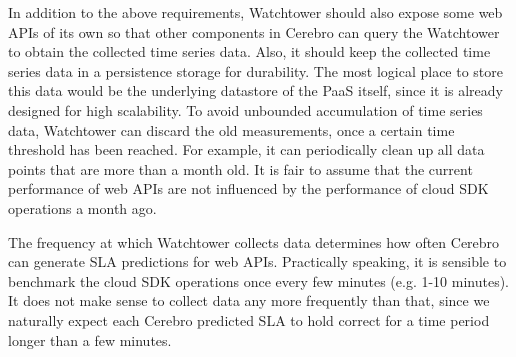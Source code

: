 In addition to the above requirements, Watchtower should also expose some web APIs of its own 
so that other components in Cerebro can query the Watchtower to obtain the collected time series data. Also,
it should keep the collected time series data in a persistence storage for durability. The most logical
place to store this data would be the underlying datastore of the PaaS itself, since it is already designed
for high scalability. To avoid unbounded accumulation of time series data, Watchtower can discard the old
measurements, once a certain time threshold has been reached. For example, it can periodically clean up
all data points that are more than a month old. It is fair to assume that the current performance of web APIs
are not influenced by the performance of cloud SDK operations a month ago. 

The frequency at which
Watchtower collects data determines how often Cerebro can generate SLA predictions for web APIs. Practically
speaking, it is sensible to benchmark the cloud SDK operations once every few minutes (e.g. 1-10 minutes). It does not make
sense to collect data any more frequently than that, since we naturally expect each Cerebro predicted SLA to 
hold correct for a time period longer than a few minutes.